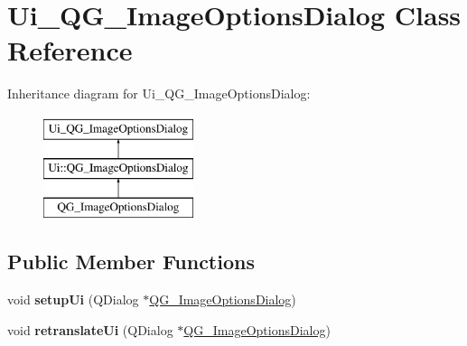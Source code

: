 \hypertarget{classUi__QG__ImageOptionsDialog}{\section{Ui\-\_\-\-Q\-G\-\_\-\-Image\-Options\-Dialog Class Reference}
\label{classUi__QG__ImageOptionsDialog}
}
Inheritance diagram for Ui\-\_\-\-Q\-G\-\_\-\-Image\-Options\-Dialog\-:\begin{figure}[H]
\begin{center}
\leavevmode
\includegraphics[height=3.000000cm]{classUi__QG__ImageOptionsDialog}
\end{center}
\end{figure}
\subsection*{Public Member Functions}
\begin{DoxyCompactItemize}
\item 
\hypertarget{classUi__QG__ImageOptionsDialog_a4c80c0c619437bfda6853e72ce50d20e}{void {\bfseries setup\-Ui} (Q\-Dialog $\ast$\hyperlink{classQG__ImageOptionsDialog}{Q\-G\-\_\-\-Image\-Options\-Dialog})}\label{classUi__QG__ImageOptionsDialog_a4c80c0c619437bfda6853e72ce50d20e}

\item 
\hypertarget{classUi__QG__ImageOptionsDialog_abbb9687fc28bdd08828ccd9b7be65a5a}{void {\bfseries retranslate\-Ui} (Q\-Dialog $\ast$\hyperlink{classQG__ImageOptionsDialog}{Q\-G\-\_\-\-Image\-Options\-Dialog})}\label{classUi__QG__ImageOptionsDialog_abbb9687fc28bdd08828ccd9b7be65a5a}

\end{DoxyCompactItemize}
